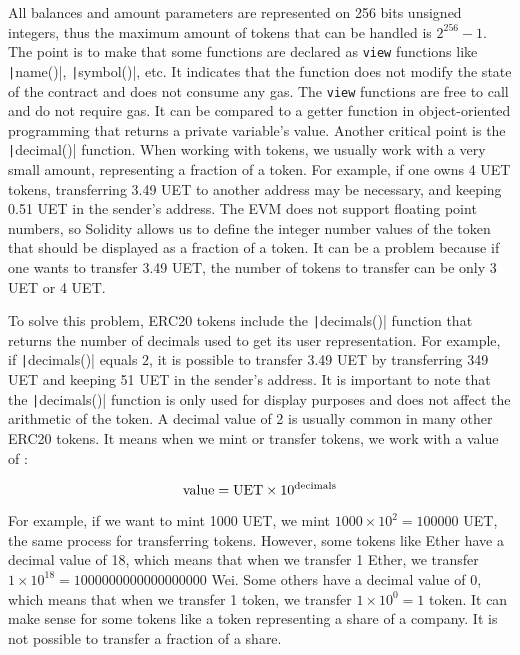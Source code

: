 All balances and amount parameters are represented on 256 bits unsigned integers, thus the maximum amount of tokens that can be handled is $2^{256} - 1$. The point is to make that some functions are declared as \texttt{view} functions
like \texttt|name()|, \texttt|symbol()|, etc. It indicates that the function does not modify the state of the contract and does not consume any gas. The \texttt{view} functions are free to call and do not require gas.
It can be compared to a getter function in object-oriented programming that returns a private variable's value. Another critical point is the \texttt|decimal()| function. When working
with tokens, we usually work with a very small amount, representing a fraction of a token. For example, if one owns 4 UET tokens, transferring 3.49 UET to another address may be necessary, and keeping 0.51 UET in the sender's address. The EVM does not support floating point numbers, so Solidity allows us to define the integer number values of the token that should be displayed as a fraction of a token.
It can be a problem because if one wants to transfer 3.49 UET, the number of tokens to transfer can be only 3 UET or 4 UET.

To solve this problem, ERC20 tokens include the \texttt|decimals()| function that returns the number of decimals used to get its user representation. For example, if \texttt|decimals()| equals $2$,
it is possible to transfer 3.49 UET by transferring 349 UET and keeping 51 UET in the sender's address. It is important to note that the \texttt|decimals()| function is only used for display purposes
and does not affect the arithmetic of the token. A decimal value of 2 is usually common in many other ERC20 tokens. It means when we mint or transfer tokens, we work with a value of :

\begin{center}
    \begin{equation}
        \centering
        \text{value} = \text{UET} \times 10^{\text{decimals}}
    \end{equation}
    \label{eq:decimals}
 \end{center}
 
 
 For example, if we want to mint 1000 UET, we mint $1000 \times 10^2 = 100000$ UET, the same process for transferring tokens. However, some tokens
 like Ether have a decimal value of 18, which means that when we transfer 1 Ether, we transfer $1 \times 10^{18} = 1000000000000000000$ Wei. Some others have a decimal value of 0,
 which means that when we transfer 1 token, we transfer $1 \times 10^0 = 1$ token. It can make sense for some tokens like a token representing a share of a company. It is not possible to transfer
 a fraction of a share. 

